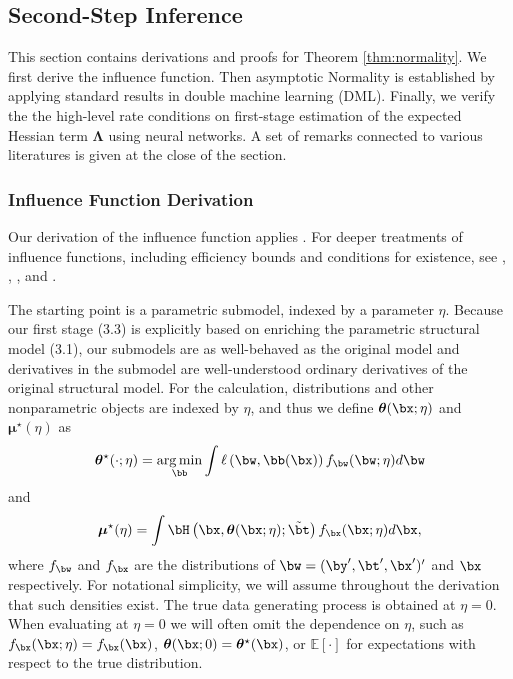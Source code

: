 \documentclass[12pt]{article}
\numberwithin{equation}{section}
\theoremstyle{definition}
\DeclareMathOperator*{\argmin}{arg\,min}
\newcommand{\E}{\mathbb{E}}
\newcommand{\bmu}{\boldsymbol{\mu}}
\newcommand{\btheta}{\boldsymbol{\theta}}
\newcommand{\bL}{\boldsymbol{\Lambda}}
\newcommand{\bmtrue}{\bmu^\star}
\newcommand{\bttrue}{\btheta^\star}
\newcommand{\btstar}{\tilde{\bt}}
\begin{document}
\begin{appendices}
\subsection{Second-Step Inference}
    \label{appx:dml}


This section contains derivations and proofs for Theorem \ref{thm:normality}. We first derive the influence function. Then asymptotic Normality is established by applying standard results in double machine learning (DML). Finally, we verify the the high-level rate conditions on first-stage estimation of the expected Hessian term $\bL$ using neural networks. A set of remarks connected to various literatures is given at the close of the section.




\subsubsection{Influence Function Derivation}
    \label{appx:IF proof}


Our derivation of the influence function applies \cite{Newey1994_Ecma}. For deeper treatments of influence functions, including efficiency bounds and conditions for existence, see \cite{Newey1990_JAE}, \cite{Newey1994_Ecma}, \citet[Chapter 25]{vanderVaart1998_book}, and \cite{Ichimura-Newey2022_QE}.



The starting point is a parametric submodel, indexed by a parameter $\eta$. Because our first stage (3.3) is explicitly based on enriching the parametric structural model (3.1), our submodels are as well-behaved as the original model and derivatives in the submodel are well-understood ordinary derivatives of the original structural model. For the calculation, distributions and other nonparametric objects are indexed by $\eta$, and thus we define $\btheta(\bx;\eta)$ and $\bmtrue(\eta)$ as
\begin{equation}
	\label{appxeqn:theta eta}
	\bttrue(\cdot; \eta) = \argmin_{\bb} \int  \ell\left(\bw, \bb(\bx) \right) f_{\bw} (\bw ;\eta ) d\bw 
\end{equation}
and
\begin{equation}
	\label{appxeqn:mu eta}
	\bmtrue(\eta) = \int \bH\left(\bx, \btheta(\bx;\eta); \btstar\right) f_{\bx}(\bx ; \eta) d\bx,
\end{equation}
where $f_{\bw}$ and $f_{\bx}$ are the distributions of $\bw = (\by', \bt', \bx')'$ and $\bx$ respectively. For notational simplicity, we will assume throughout the derivation that such densities exist. The true data generating process is obtained at $\eta = 0$. When evaluating at $\eta=0$ we will often omit the dependence on $\eta$, such as $f_{\bx}(\bx ; \eta) = f_{\bx}(\bx)$, $\btheta(\bx ; 0) = \bttrue(\bx)$, or $\E[\cdot]$ for expectations with respect to the true distribution.


\end{appendices}
\end{document}
